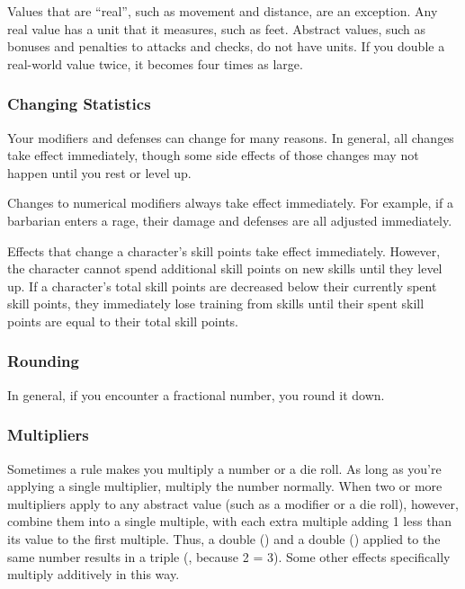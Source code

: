              Values that are ``real'', such as movement and distance, are an exception.
            Any real value has a unit that it measures, such as feet.
            Abstract values, such as bonuses and penalties to attacks and checks, do not have units.
            If you double a real-world value twice, it becomes four times as large.

        \subsubsection{Changing Statistics}

            Your modifiers and defenses can change for many reasons.
            In general, all changes take effect immediately, though some side effects of those changes may not happen until you rest or level up.

             Changes to numerical modifiers always take effect immediately.
            For example, if a barbarian enters a rage, their damage and defenses are all adjusted immediately.

             Effects that change a character's skill points take effect immediately.
            However, the character cannot spend additional skill points on new skills until they level up.
            If a character's total skill points are decreased below their currently spent skill points, they immediately lose training from skills until their spent skill points are equal to their total skill points.

        \subsubsection{Rounding}
            In general, if you encounter a fractional number, you round it down.

        \subsubsection{Multipliers}
            Sometimes a rule makes you multiply a number or a die roll.
            As long as you're applying a single multiplier, multiply the number normally.
            When two or more multipliers apply to any abstract value (such as a modifier or a die roll), however, combine them into a single multiple, with each extra multiple adding 1 less than its value to the first multiple.
            Thus, a double () and a double () applied to the same number results in a triple (, because 2  = 3).
            Some other effects specifically multiply additively in this way.

